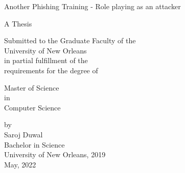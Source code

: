 \providecommand{\tabularnewline}{\\}

\begin{titlepage}
    \begin{center}\large
        Another Phishing Training - Role playing as an attacker
        \vspace{5em}

        A Thesis

        \vspace{5em}

        \begin{singlespace}

            Submitted to the Graduate Faculty of the  \\
            University of New Orleans \\
            in partial fulfillment of the \\
            requirements for the degree of
        \end{singlespace}

        \vspace{5em}
        \begin{singlespace}
            Master of Science \\
            in \\
            Computer Science
        \end{singlespace}

        \vspace{5em}
        \par\end{center}
    \begin{center}\large
        \hspace{12pt} by \\
        \hspace{12pt} Saroj Duwal \\
        \hspace{12pt} Bachelor in Science \\
        \hspace{12pt} University of New Orleans, 2019 \\
        \hspace{12pt} May, 2022\\


        \par\end{center}
\end{titlepage}
\pagebreak{}
\clearpage
\setcounter{page}{2}


